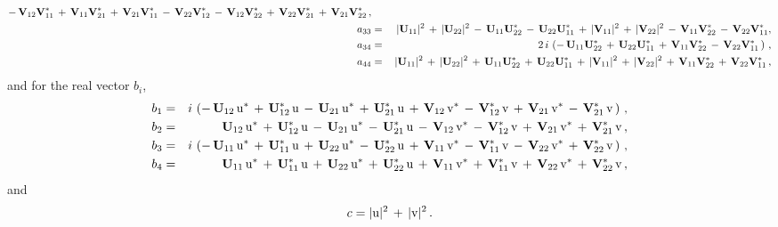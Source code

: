\documentclass[
 reprint,
 amsmath,amssymb,
 aps,
prd,
]{revtex4-1}
\begin{document}
\begin{widetext}
\begin{eqnarray}
-\,\VM_{12}\VMC_{11}\,
+\,\VM_{11}\VMC_{21}\,
+\,\VM_{21}\VMC_{11}\,
-\,\VM_{22}\VMC_{12}\,
-\,\VM_{12}\VMC_{22}\,
+\,\VM_{22}\VMC_{21}\,
+\,\VM_{21}\VMC_{22}\,
, \\
%
a_{33} &=& 
 \,|\UM_{11}|^{2}\,
+\,|\UM_{22}|^{2}\,
-\,\UM_{11}\UMC_{22}\,
-\,\UM_{22}\UMC_{11}\,
+\,|\VM_{11}|^{2}\,
+\,|\VM_{22}|^{2}\,
-\,\VM_{11}\VMC_{22}\,
-\,\VM_{22}\VMC_{11} 
, \\
%
a_{34} &=& 2 \, i\, \left (
-\,\UM_{11}\UMC_{22}\,
+\,\UM_{22}\UMC_{11}\,  
+\,\VM_{11}\VMC_{22}\,
-\,\VM_{22}\VMC_{11}\,
\right ) \, ,
\\
%
a_{44} &=& 
 \,|\UM_{11}|^{2}\,
+\,|\UM_{22}|^{2}\,
+\,\UM_{11}\UMC_{22}\,
+\,\UM_{22}\UMC_{11}\,
+\,|\VM_{11}|^{2}\,
+\,|\VM_{22}|^{2}\,
+\,\VM_{11}\VMC_{22}\,
+\,\VM_{22}\VMC_{11}\, 
,
%
\end{eqnarray}
%
and for the real vector $b_{i}$,
%
\begin{eqnarray}
b_{1} &=& i\, \left (
-\, {\bf U}_{12}\,\mathrm{u}^{*}\,
+\,{\bf U}^{*}_{12}\,\mathrm{u}\,
-\, {\bf U}_{21}\,\mathrm{u}^{*}\,
+\,{\bf U}^{*}_{21}\,\mathrm{u}\,
+\, {\bf V}_{12}\,\mathrm{v}^{*}\,
-\,{\bf V}^{*}_{12}\,\mathrm{v}\,
+\, {\bf V}_{21}\,\mathrm{v}^{*}\,
-\,{\bf V}^{*}_{21}\,\mathrm{v}\, 
\right ) \, ,
\\
b_{2} &=&\qquad \!
 \, {\bf U}_{12}\,\mathrm{u}^{*}\,
+\,{\bf U}^{*}_{12}\,\mathrm{u}\,
-\, {\bf U}_{21}\,\mathrm{u}^{*}\,
-\,{\bf U}^{*}_{21}\,\mathrm{u}\,
-\, {\bf V}_{12}\,\mathrm{v}^{*}\,   
-\,{\bf V}^{*}_{12}\,\mathrm{v}\,
+\, {\bf V}_{21}\,\mathrm{v}^{*}\,
+\,{\bf V}^{*}_{21}\,\mathrm{v}\, 
, \\
b_{3} &=& i\, \left (
-\, {\bf U}_{11}\,\mathrm{u}^{*}\,
+\,{\bf U}^{*}_{11}\,\mathrm{u}\,
+\, {\bf U}_{22}\,\mathrm{u}^{*}\,
-\,{\bf U}^{*}_{22}\,\mathrm{u}\,
+\, {\bf V}_{11}\,\mathrm{v}^{*}\,
-\,{\bf V}^{*}_{11}\,\mathrm{v}\,
-\, {\bf V}_{22}\,\mathrm{v}^{*}\,
+\,{\bf V}^{*}_{22}\,\mathrm{v}\, 
\right ) \, ,
\\
b_{4} &=& \qquad \!
 \, {\bf U}_{11}\,\mathrm{u}^{*}\,
+\,{\bf U}^{*}_{11}\,\mathrm{u}\,
+\, {\bf U}_{22}\,\mathrm{u}^{*}\,
+\,{\bf U}^{*}_{22}\,\mathrm{u}\,
+\, {\bf V}_{11}\,\mathrm{v}^{*}\,
+\,{\bf V}^{*}_{11}\,\mathrm{v}\,
+\, {\bf V}_{22}\,\mathrm{v}^{*}\,
+\,{\bf V}^{*}_{22}\,\mathrm{v} \, 
,
\end{eqnarray}
and
\begin{equation}
c = |\mathrm{u}|^{2}\,+\,|\mathrm{v}|^{2} 
\, .
\end{equation}

\end{widetext}
%
%
\end{document}
